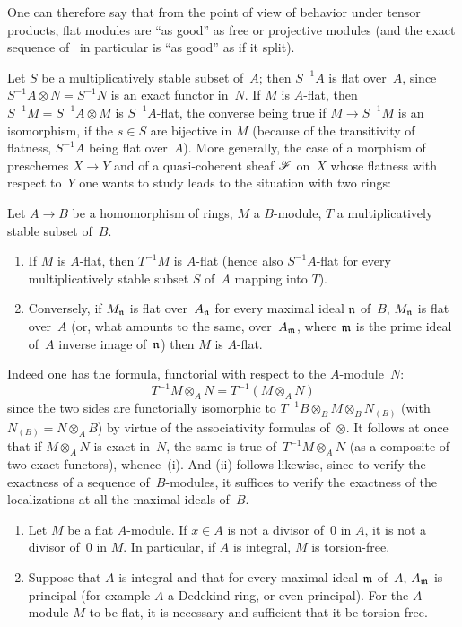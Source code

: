 One can therefore say that from the point of view of behavior under
tensor products, flat modules are ``as good'' as free or projective
modules (and the exact sequence of~ in particular is ``as
good'' as if it split).

Let $S$ be a multiplicatively stable subset of~$A$; then $S^{-1}A$ is
flat over~$A$, since $S^{-1}A \otimes N=S^{-1}N$ is an exact functor
in~$N$. If $M$ is $A$-flat, then $S^{-1}M=S^{-1}A \otimes M$ is
$S^{-1}A$-flat, the converse being true if $M \to S^{-1}M$ is an
isomorphism, \ie if the $s \in S$ are bijective in $M$ (because of the
transitivity of flatness, $S^{-1}A$ being flat over~$A$). More
generally, the case of a morphism of preschemes $X \to Y$ and of a
quasi-coherent sheaf $\cal{F}$ on~$X$ whose flatness with respect
to~$Y$ one wants to study leads to the situation with two rings:

\begin{proposition}
\label{IV.1.2}
Let $A \to B$ be a homomorphism of rings, $M$ a $B$-module, $T$ a
multiplicatively stable subset of~$B$.
\begin{enumerate}
\item[(i)] If $M$ is $A$-flat, then $T^{-1}M$ is $A$-flat (hence also
$S^{-1}A$-flat for every multiplicatively stable subset $S$ of~$A$
mapping into $T$).
\item[(ii)] Conversely, if $M_{\mathfrak{n}}$ is flat over~$A_{\mathfrak{n}}$
for every maximal ideal $\mathfrak{n}$ of~$B$, $M_{\mathfrak{n}}$ is flat
over~$A$ (or, what amounts to the same, over~$A_{\mathfrak{m}}$, where
$\mathfrak{m}$ is the prime ideal of~$A$ inverse image of~$\mathfrak{n}$)
then $M$ is $A$-flat.
\end{enumerate}
\end{proposition}

Indeed one has the formula, functorial with respect to the
$A$-module~$N$:
$$
T^{-1}M \otimes_{A} N=T^{-1}(M \otimes_{A} N)
$$
since the two sides are functorially isomorphic to $T^{-1}B
\otimes_{B} M \otimes_{B} N_{(B)}$ (with $N_{(B)}=N \otimes_{A} B$) by
virtue of the associativity formulas of~$\otimes$. It follows at once
that if $M \otimes_{A} N$ is exact in~$N$, the same is true
of~$T^{-1}M \otimes_{A} N$ (as a composite of two exact functors),
whence~(i). And (ii) follows likewise, since to verify the exactness
of a sequence of~$B$-modules, it suffices to verify the exactness of
the localizations at all the maximal ideals of~$B$.

\begin{proposition}
\label{IV.1.3}
\begin{enumerate}
\item[(i)] Let
$M$ be a flat $A$-module. If $x \in A$ is not a divisor of~$0$ in $A$,
it is not a divisor of~$0$ in $M$. In particular, if $A$ is integral,
$M$ is torsion-free.
\item[(ii)] Suppose that $A$ is integral and that for every maximal
ideal $\mathfrak{m}$ of~$A$, $A_{\mathfrak{m}}$ is principal (for example $A$
a Dedekind ring, or even principal). For the $A$-module $M$ to be
flat, it is necessary and sufficient that it be torsion-free.
\end{enumerate}
\end{proposition}

